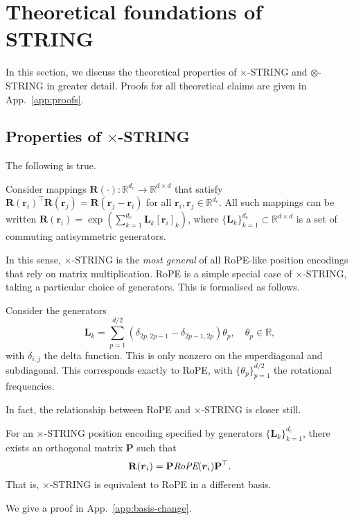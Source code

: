 \section{Theoretical foundations of STRING} \label{sec:theoretical_foundations}
In this section, we discuss the theoretical properties of $\times$-STRING and $\otimes$-STRING in greater detail.
Proofs for all theoretical claims are given in App.~\ref{app:proofs}.

\subsection{Properties of $\times$-STRING}
The following is true.
\begin{theorem} \label{thm:x-string-deriv}
Consider mappings $\mathbf{R}(\cdot):\mathbb{R}^{d_c} \to \mathbb{R}^{d \times d}$ that satisfy $\mathbf{R}(\mathbf{r}_i)^\top \mathbf{R}(\mathbf{r}_j) = \mathbf{R}(\mathbf{r}_j - \mathbf{r}_i)$ for all $\mathbf{r}_i, \mathbf{r}_j \in \mathbb{R}^{d_c}$.
All such mappings can be written $ \mathbf{R}(\mathbf{r}_i) = \exp \left (\sum_{k=1}^{d_c} \mathbf{L}_k [\mathbf{r}_i]_k \right )$,
where $\{\mathbf{L}_k\}_{k=1}^{d_c} \subset \mathbb{R}^{d \times d}$ is a set of commuting antisymmetric generators. 
\end{theorem}
In this sense, $\times$-STRING is the \emph{most general} of all RoPE-like position encodings that rely on matrix multiplication. 
RoPE is a simple special case of $\times$-STRING, taking a particular choice of generators. 
This is formalised as follows.
\begin{theorem} \label{thm:rope_special_case_1}
Consider the generators
\begin{equation}
    \mathbf{L}_k =  \sum_{p=1}^{d/2} (\delta_{2p,2p-1} - \delta_{2p-1,2p}) \theta_p, \quad \theta_p \in \mathbb{R},
\end{equation}
with $\delta_{i,j}$ the delta function.
This is only nonzero on the superdiagonal and subdiagonal. 
This corresponds exactly to RoPE, with $\{\theta_p\}_{p=1}^{d/2}$ the rotational frequencies.
\end{theorem}
In fact, the relationship between RoPE and $\times$-STRING is closer still.
\begin{theorem}\label{thm:basis_change}
For an $\times$-STRING position encoding specified by generators $\{\mathbf{L}_k\}_{k=1}^{d_c}$, there exists an orthogonal matrix $\mathbf{P}$ such that
\begin{equation}
    \mathbf{R}(\boldsymbol{r}_i) = \mathbf{P} \emph{\textrm{RoPE}}(\boldsymbol{r}_i) \mathbf{P}^\top.
\end{equation}
That is, $\times$-STRING is equivalent to RoPE in a different basis.
\end{theorem}
We give a proof in App.~\ref{app:basis-change}.


